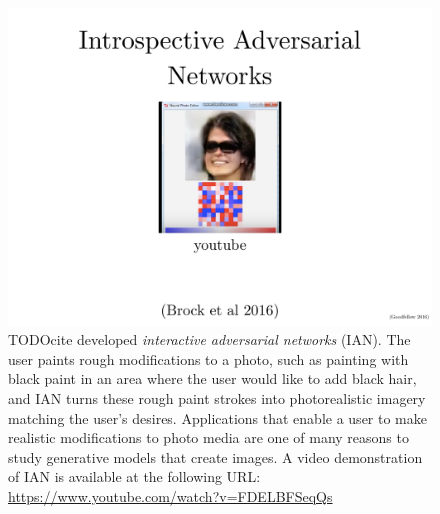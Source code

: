 \begin{figure}
  \centering
  \includegraphics[width=\textwidth]{ian}
  \caption{
    TODOcite developed {\em interactive adversarial networks} (IAN).
    The user paints rough modifications to a photo, such as painting
    with black paint in an area where the user would like to add black
    hair, and IAN turns these rough paint strokes into photorealistic
    imagery matching the user's desires.
    Applications that enable a user to make realistic modifications to
    photo media are one of many reasons to study generative models
    that create images.
    A video demonstration of IAN is available at the following URL:
    \url{https://www.youtube.com/watch?v=FDELBFSeqQs}
  }
  \label{fig:ian}
\end{figure}
